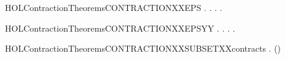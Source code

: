 \newcommand{\HOLContractionTheoremsCOMPXXCONTRACTION}{\UseVerbatim{HOLContractionTheoremsCOMPXXCONTRACTION}}
\begin{SaveVerbatim}{HOLContractionTheoremsCONTRACTIONXXEPS}
\HOLTokenTurnstile{} \HOLSymConst{\HOLTokenForall{}}.
         \HOLSymConst{\HOLTokenImp{}}
       \HOLSymConst{\HOLTokenForall{}} .
              \HOLSymConst{\HOLTokenImp{}} \HOLSymConst{\HOLTokenForall{}}.    \HOLSymConst{\HOLTokenImp{}} \HOLSymConst{\HOLTokenExists{}}.    \HOLSymConst{\HOLTokenConj{}}   
\end{SaveVerbatim}
\newcommand{\HOLContractionTheoremsCONTRACTIONXXEPS}{\UseVerbatim{HOLContractionTheoremsCONTRACTIONXXEPS}}
\begin{SaveVerbatim}{HOLContractionTheoremsCONTRACTIONXXEPSYY}
\HOLTokenTurnstile{} \HOLSymConst{\HOLTokenForall{}}.
         \HOLSymConst{\HOLTokenImp{}}
       \HOLSymConst{\HOLTokenForall{}} .
              \HOLSymConst{\HOLTokenImp{}}
           \HOLSymConst{\HOLTokenForall{}} .    \HOLSymConst{\HOLTokenImp{}} \HOLSymConst{\HOLTokenExists{}}.    \HOLSymConst{\HOLTokenConj{}}   
\end{SaveVerbatim}
\newcommand{\HOLContractionTheoremsCONTRACTIONXXEPSYY}{\UseVerbatim{HOLContractionTheoremsCONTRACTIONXXEPSYY}}
\begin{SaveVerbatim}{HOLContractionTheoremsCONTRACTIONXXSUBSETXXcontracts}
\HOLTokenTurnstile{} \HOLSymConst{\HOLTokenForall{}}.   \HOLSymConst{\HOLTokenImp{}}   ()
\end{SaveVerbatim}
\newcommand{\HOLContractionTheoremsCONTRACTIONXXSUBSETXXcontracts}{\UseVerbatim{HOLContractionTheoremsCONTRACTIONXXSUBSETXXcontracts}}
